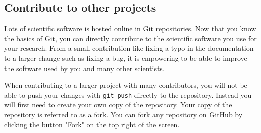 \subsection{Contribute to other projects}

Lots of scientific software is hosted online in Git repositories.
Now that you know the basics of Git, you can directly contribute to the scientific software you use for your research.
From a small contribution like fixing a typo in the documentation to a larger change such as fixing a bug, it is empowering to be able to improve the software used by you and many other scientists.

When contributing to a larger project with many contributors, you will not be able to push your changes with \verb|git push| directly to the repository.
Instead you will first need to create your own copy of the repository.
Your copy of the repository is referred to as a fork.
You can fork any repository on GitHub by clicking the button "Fork" on the top right of the screen.
